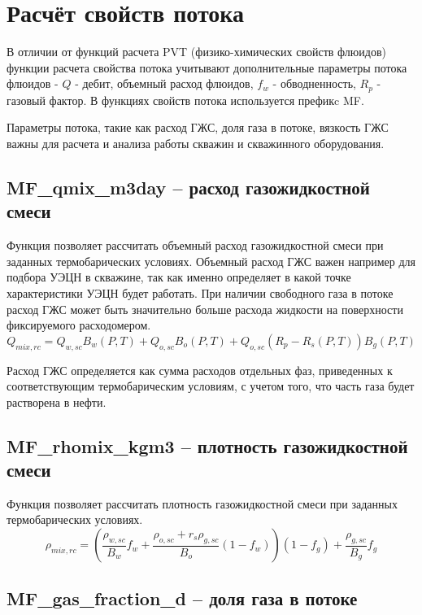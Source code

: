 \section{Расчёт свойств потока}

В отличии от функций расчета PVT (физико-химических свойств флюидов) функции расчета свойства потока учитывают дополнительные параметры потока флюидов - $Q$ - дебит, объемный расход флюидов, $f_w$ - обводненность, $R_p$ - газовый фактор. В функциях свойств потока используется префикc MF.

Параметры потока, такие как расход ГЖС, доля газа в потоке, вязкость ГЖС важны для расчета и анализа работы скважин и скважинного оборудования.


\subsection{MF\_qmix\_m3day – расход газожидкостной смеси}

Функция позволяет рассчитать объемный расход газожидкостной смеси при заданных термобарических условиях. Объемный расход ГЖС важен например для подбора УЭЦН в скважине, так как именно определяет в какой точке характеристики УЭЦН будет работать. При наличии свободного газа в потоке расход ГЖС может быть значительно больше расхода жидкости на поверхности фиксируемого расходомером.
$$Q_{mix,rc} = Q_{w,sc} B_w(P,T) + Q_{o,sc} B_o(P,T)  + Q_{o,sc}  (R_p - R_s(P,T)) B_g(P,T) $$

Расход ГЖС определяется как сумма расходов отдельных фаз, приведенных к соответствующим термобарическим условиям, с учетом того, что часть газа будет растворена в нефти.


\subsection{MF\_rhomix\_kgm3 – плотность газожидкостной смеси}

Функция позволяет рассчитать плотность газожидкостной смеси при заданных термобарических условиях. 
$$\rho_{mix,rc} = \left( \frac{\rho_{w,sc}}{B_w} f_w + \frac{\rho_{o,sc} +r_s \rho_{g,sc} }{B_o}(1-f_w) \right) (1-f_g) + \frac{ \rho_{g,sc} }{B_g} f_g $$


\subsection{MF\_gas\_fraction\_d – доля газа в потоке}

